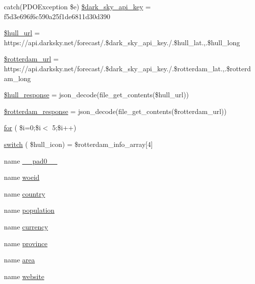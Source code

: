 \begin{DoxyCompactItemize}
\item 
catch(P\+D\+O\+Exception \$e) \mbox{\hyperlink{index_8php_ada1a70a25b2c9bf4be490a80f1ca5f50}{\$dark\+\_\+sky\+\_\+api\+\_\+key}} = \textquotesingle{}f5d3e696f6c590a25f1de6811d30d390\textquotesingle{}
\item 
\mbox{\hyperlink{index_8php_a0ed7f50cb33c512a645e5a337f2b8ffb}{\$hull\+\_\+url}} = \textquotesingle{}https\+://api.\+darksky.\+net/forecast/\textquotesingle{}.\$dark\+\_\+sky\+\_\+api\+\_\+key.\textquotesingle{}/\textquotesingle{}.\$hull\+\_\+lat.\textquotesingle{},\textquotesingle{}.\$hull\+\_\+long
\item 
\mbox{\hyperlink{index_8php_adeffa649498546844bc0e7421bd4b140}{\$rotterdam\+\_\+url}} = \textquotesingle{}https\+://api.\+darksky.\+net/forecast/\textquotesingle{}.\$dark\+\_\+sky\+\_\+api\+\_\+key.\textquotesingle{}/\textquotesingle{}.\$rotterdam\+\_\+lat.\textquotesingle{},\textquotesingle{}.\$rotterdam\+\_\+long
\item 
\mbox{\hyperlink{index_8php_a1c4e9907a22b4c6da1c5a7837a4d539e}{\$hull\+\_\+response}} = json\+\_\+decode(file\+\_\+get\+\_\+contents(\$hull\+\_\+url))
\item 
\mbox{\hyperlink{index_8php_a3257c196b67efb81ddcc803e2cac7ed2}{\$rotterdam\+\_\+response}} = json\+\_\+decode(file\+\_\+get\+\_\+contents(\$rotterdam\+\_\+url))
\item 
\mbox{\hyperlink{index_8php_a2e79af1ba492bd2cbbaafa83f16262da}{for}} ( \$i=0;\$i$<$ 5;\$i++)
\item 
\mbox{\hyperlink{index_8php_a8ecbe44a6e1f2b1430c183427ca99513}{switch}} ( \$hull\+\_\+icon) = \$rotterdam\+\_\+info\+\_\+array\mbox{[}4\mbox{]}
\item 
name \mbox{\hyperlink{index_8php_a36342860613418f919ffbf3aa4246442}{\+\_\+\+\_\+pad0\+\_\+\+\_\+}}
\item 
name \mbox{\hyperlink{index_8php_a351cdce8b3559e1c850fe0223c244ef7}{woeid}}
\item 
name \mbox{\hyperlink{index_8php_a0f0752705301c982dc8994ebc993e6e9}{country}}
\item 
name \mbox{\hyperlink{index_8php_aa78fa356925cd3f67d485c4d6846202b}{population}}
\item 
name \mbox{\hyperlink{index_8php_abd84e0698c321abdbf211d5b8425d0b5}{currency}}
\item 
name \mbox{\hyperlink{index_8php_a38d70414c65575df5643ad4296c9db2e}{province}}
\item 
name \mbox{\hyperlink{index_8php_a5198216176428aa2303311f956213f33}{area}}
\item 
name \mbox{\hyperlink{index_8php_a8c56014cff17c1ced653aa98455da680}{website}}
\end{DoxyCompactItemize}


